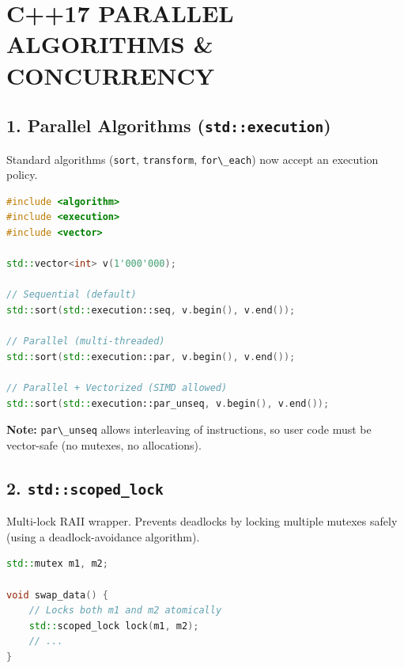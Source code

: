 \hypertarget{c17-parallel-algorithms-concurrency}{%
\chapter{C++17 PARALLEL ALGORITHMS \&
CONCURRENCY}\label{c17-parallel-algorithms-concurrency}}

\hypertarget{parallel-algorithms-stdexecution}{%
\section{\texorpdfstring{1. Parallel Algorithms
(\texttt{std::execution})}{1. Parallel Algorithms (std::execution)}}\label{parallel-algorithms-stdexecution}}

Standard algorithms (\passthrough{\lstinline!sort!},
\passthrough{\lstinline!transform!},
\passthrough{\lstinline!for\_each!}) now accept an execution policy.

\begin{lstlisting}[language={C++}]
#include <algorithm>
#include <execution>
#include <vector>

std::vector<int> v(1'000'000);

// Sequential (default)
std::sort(std::execution::seq, v.begin(), v.end());

// Parallel (multi-threaded)
std::sort(std::execution::par, v.begin(), v.end());

// Parallel + Vectorized (SIMD allowed)
std::sort(std::execution::par_unseq, v.begin(), v.end());
\end{lstlisting}

\textbf{Note:} \passthrough{\lstinline!par\_unseq!} allows interleaving
of instructions, so user code must be vector-safe (no mutexes, no
allocations).

\hypertarget{stdscoped_lock}{%
\section{\texorpdfstring{2.
\texttt{std::scoped\_lock}}{2. std::scoped\_lock}}\label{stdscoped_lock}}

Multi-lock RAII wrapper. Prevents deadlocks by locking multiple mutexes
safely (using a deadlock-avoidance algorithm).

\begin{lstlisting}[language={C++}]
std::mutex m1, m2;

void swap_data() {
    // Locks both m1 and m2 atomically
    std::scoped_lock lock(m1, m2); 
    // ...
}
\end{lstlisting}

